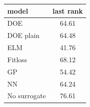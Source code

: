 \begin{tabular}{|lc|}
\hline
model & last rank\\
\hline
DOE & 64.61 \\
DOE plain & 64.48 \\
ELM & 41.76 \\
Fitloss & 68.12 \\
GP & 54.42 \\
NN & 64.24 \\
No surrogate & 76.61 \\
\hline
\end{tabular}
